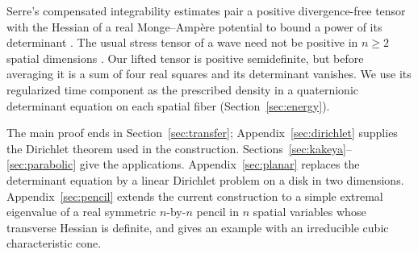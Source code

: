 Serre's compensated integrability estimates pair a positive
divergence-free tensor with the Hessian of a real Monge--Ampère
potential to bound a power of its determinant
\cite[Section~5.1]{Serre2018}. The usual stress tensor of a wave need
not be positive in \(n\ge2\) spatial dimensions
\cite[Section~4.1]{Serre2019}. Our lifted tensor is positive
semidefinite, but before averaging it is a sum of four real squares
and its determinant vanishes. We use its regularized time component as the prescribed
density in a quaternionic determinant equation on each spatial fiber
(Section~\ref{sec:energy}).

The main proof ends in Section~\ref{sec:transfer}; Appendix~\ref{sec:dirichlet}
supplies the Dirichlet theorem used in the construction.
Sections~\ref{sec:kakeya}--\ref{sec:parabolic} give the applications.
Appendix~\ref{sec:planar} replaces the determinant equation by a linear
Dirichlet problem on a disk in two dimensions. Appendix~\ref{sec:pencil}
extends the current construction to a simple extremal eigenvalue of a
real symmetric \(n\)-by-\(n\) pencil in \(n\) spatial variables whose
transverse Hessian is definite, and gives an example with an irreducible
cubic characteristic cone.
